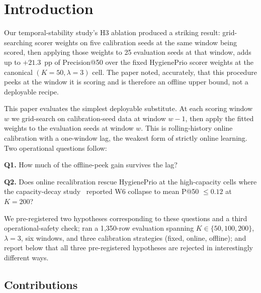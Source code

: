 \section{Introduction}

Our temporal-stability study's H3 ablation produced a striking result:
grid-searching scorer weights on five calibration seeds at the same
window being scored, then applying those weights to 25 evaluation
seeds at that window, adds up to $+21.3$~pp of Precision@50 over the
fixed HygienePrio scorer weights at the canonical $(K = 50, \lambda = 3)$ cell.
The paper noted, accurately, that this procedure peeks at the window
it is scoring and is therefore an offline upper bound, not a deployable
recipe.

This paper evaluates the simplest deployable substitute. At each
scoring window $w$ we grid-search on calibration-seed data at window
$w - 1$, then apply the fitted weights to the evaluation seeds at
window $w$. This is rolling-history online calibration with a
one-window lag, the weakest form of strictly online learning. Two
operational questions follow:

\textbf{Q1.} How much of the offline-peek gain survives the lag?

\textbf{Q2.} Does online recalibration rescue HygienePrio at the
high-capacity cells where the capacity-decay study~\cite{paper6capacity} reported W6
collapse to mean P@50 $\leq 0.12$ at $K = 200$?

We pre-registered two hypotheses corresponding to these questions
and a third operational-safety check; ran a 1{,}350-row evaluation
spanning $K \in \{50, 100, 200\}$, $\lambda = 3$, six windows, and
three calibration strategies (\textsf{fixed}, \textsf{online},
\textsf{offline}); and report below that all three pre-registered
hypotheses are rejected in interestingly different ways.

\subsection{Contributions}

